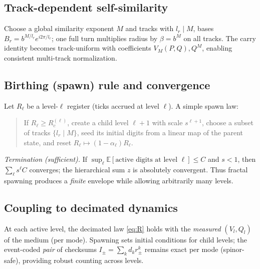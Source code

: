 \documentclass[11pt]{article}
\theoremstyle{definition}
\theoremstyle{remark}
\begin{document}
\subsection{Track-dependent self-similarity}
Choose a global similarity exponent $M$ and tracks with $l_r\mid M$, bases $B_r=b^{M/l_r}e^{i2\pi/l_r}$; one full turn multiplies radius by $\beta=b^M$ on all tracks. The carry identity becomes track-uniform with coefficients $V_M(P,Q),Q^M$, enabling consistent multi-track normalization.

\subsection{Birthing (spawn) rule and convergence}
Let $R_{\ell}$ be a level-$\ell$ register (ticks accrued at level $\ell$). A simple spawn law:
\begin{quote}
If $R_{\ell}\ge R_c^{(\ell)}$, create a child level $\ell{+}1$ with scale $s^{\ell+1}$, choose a subset of tracks $\{l_r\mid M\}$, seed its initial digits from a linear map of the parent state, and reset $R_{\ell}\mapsto(1-\alpha_{\ell})R_{\ell}$.
\end{quote}
\emph{Termination (sufficient).} If $\sup_\ell \mathbb{E}[\text{active digits at level }\ell]\le C$ and $s<1$, then
\(
\sum_{\ell} s^\ell C
\)
converges; the hierarchical sum $z$ is absolutely convergent. Thus fractal spawning produces a \emph{finite} envelope while allowing arbitrarily many levels.

\subsection{Coupling to decimated dynamics}
At each active level, the decimated law \eqref{eq:R} holds with the \emph{measured} $(V_l,Q_l)$ of the medium (per mode). Spawning sets initial conditions for child levels; the event-coded \emph{pair} of checksums $I_\pm=\sum_k d_k r_\pm^k$ remains exact per mode (spinor-safe), providing robust counting across levels.
\end{document}
